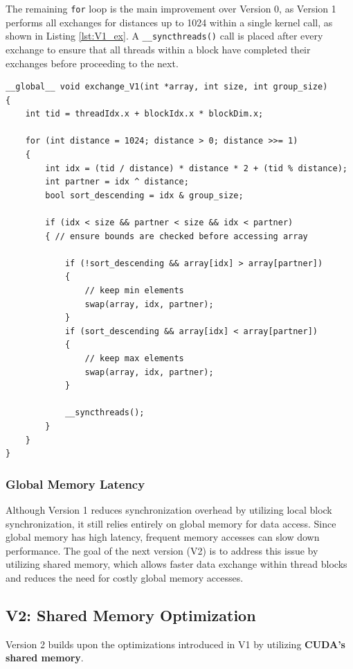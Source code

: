 \documentclass[a4paper,12pt]{article}
\begin{document}
The remaining \texttt{for} loop is the main improvement over Version 0, as Version 1 performs all exchanges for distances up to 1024 within a single kernel call, as shown in Listing \ref{lst:V1_ex}. A \texttt{\_\_syncthreads()} call is placed after every exchange to ensure that all threads within a block have completed their exchanges before proceeding to the next.
\newpage
\begin{lstlisting}[caption={V1 Exchange algorithm}, label={lst:V1_ex}]  
__global__ void exchange_V1(int *array, int size, int group_size)
{
    int tid = threadIdx.x + blockIdx.x * blockDim.x;

    for (int distance = 1024; distance > 0; distance >>= 1)
    {
        int idx = (tid / distance) * distance * 2 + (tid % distance);
        int partner = idx ^ distance;
        bool sort_descending = idx & group_size;

        if (idx < size && partner < size && idx < partner)
        { // ensure bounds are checked before accessing array

            if (!sort_descending && array[idx] > array[partner])
            {
                // keep min elements
                swap(array, idx, partner);
            }
            if (sort_descending && array[idx] < array[partner])
            {
                // keep max elements
                swap(array, idx, partner);
            }

            __syncthreads();
        }
    }
}
\end{lstlisting}

\subsubsection*{Global Memory Latency}

Although Version 1 reduces synchronization overhead by utilizing local block synchronization, it still relies entirely on global memory for data access. Since global memory has high latency, frequent memory accesses can slow down performance. The goal of the next version (V2) is to address this issue by utilizing shared memory, which allows faster data exchange within thread blocks and reduces the need for costly global memory accesses.

\subsection{V2: Shared Memory Optimization}
Version 2 builds upon the optimizations introduced in V1 by utilizing \textbf{CUDA’s shared memory}.
\end{document}
